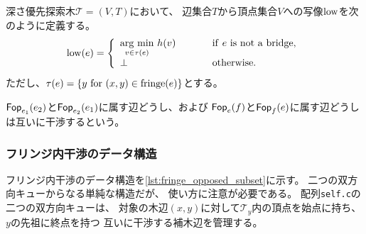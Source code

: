 \begin{definition}
深さ優先探索木${\mathcal T}=(V, T)$において、
辺集合$T$から頂点集合$V$への写像$\operatorname{low}$を次のように定義する。
\[
\low(e)=\left\{
\begin{array}{ll}
    \argmin_{v\in\tau(e)}\, h(v) ~~~~~~~~ & {\rm if}\ e\ {\rm is\ not\ a\ bridge,} \\
    \bot ~~~~~~~~~~~ & {\rm otherwise.}
\end{array}\right.
\]
ただし、$\tau(e)=\{y ~{\rm for}~ (x, y) \in \operatorname{fringe}(e)\}$とする。
\end{definition}




$\operatorname{{\sf Fop}}_{e_1}(e_2)$と$\operatorname{{\sf Fop}}_{e_2}(e_1)$に属す辺どうし、および
$\operatorname{{\sf Fop}}_e(f)$と$\operatorname{{\sf Fop}}_f(e)$に属す辺どうしは互いに干渉するという。







\subsubsection{フリンジ内干渉のデータ構造}
フリンジ内干渉のデータ構造を\lstrefname\ref{lst:fringe_opposed_subset}に示す。
二つの双方向キューからなる単純な構造だが、
使い方に注意が必要である。
配列{\tt self.c}の二つの双方向キューは、
対象の木辺$(x, y)$に対して${\mathcal T}_y$内の頂点を始点に持ち、
$y$の先祖に終点を持つ%
互いに干渉する補木辺を管理する。


